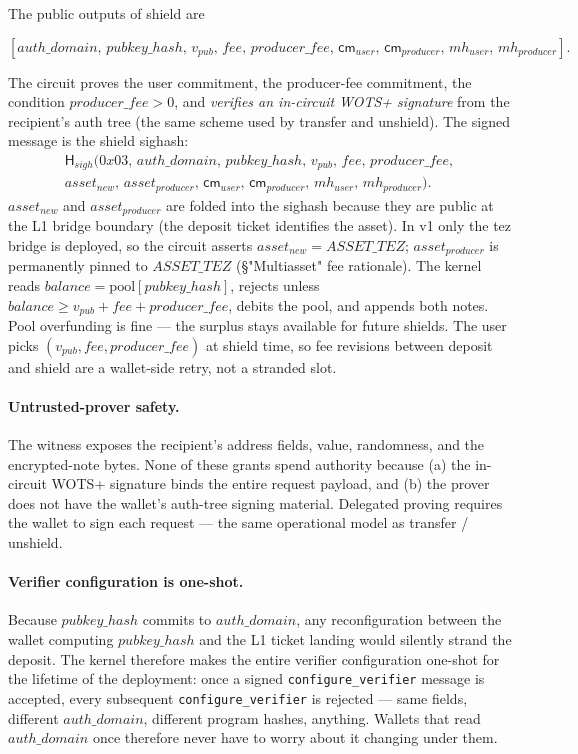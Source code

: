 \documentclass[11pt]{article}
\newcommand{\Hash}{\mathsf{H}}
\newcommand{\cm}{\mathsf{cm}}
\begin{document}
The public outputs of shield are

\[
[auth\_domain,\, pubkey\_hash,\, v_{pub},\, fee,\, producer\_fee,\, \cm_{user},\, \cm_{producer},\,
 mh_{user},\, mh_{producer}].
\]

The circuit proves the user commitment, the producer-fee commitment, the
condition \(producer\_fee > 0\), and \emph{verifies an in-circuit WOTS+
signature} from the recipient's auth tree (the same scheme used by
transfer and unshield). The signed message is the shield sighash:
\begin{multline*}
\Hash_{sigh}(0x03,\, auth\_domain,\, pubkey\_hash,\, v_{pub},\, fee,\, producer\_fee,\\
              asset_{new},\, asset_{producer},\,
              \cm_{user},\, \cm_{producer},\, mh_{user},\, mh_{producer}).
\end{multline*}
\(asset_{new}\) and \(asset_{producer}\) are folded into the sighash
because they are public at the L1 bridge boundary (the deposit ticket
identifies the asset). In v1 only the tez bridge is deployed, so the
circuit asserts \(asset_{new} = ASSET\_TEZ\); \(asset_{producer}\) is
permanently pinned to \(ASSET\_TEZ\) (§"Multiasset" fee rationale).
The kernel reads \(balance = \mathrm{pool}[pubkey\_hash]\), rejects unless
\(balance \ge v_{pub} + fee + producer\_fee\), debits the pool, and
appends both notes. Pool overfunding is fine — the surplus stays
available for future shields. The user picks
\((v_{pub}, fee, producer\_fee)\) at shield time, so fee revisions
between deposit and shield are a wallet-side retry, not a stranded slot.

\paragraph{Untrusted-prover safety.} The witness exposes the recipient's
address fields, value, randomness, and the encrypted-note bytes. None of these
grants spend authority because (a) the in-circuit WOTS+ signature binds the
entire request payload, and (b) the prover does not have the wallet's
auth-tree signing material. Delegated proving requires the wallet to
sign each request — the same operational model as transfer / unshield.

\paragraph{Verifier configuration is one-shot.} Because
\(pubkey\_hash\) commits to \(auth\_domain\), any reconfiguration
between the wallet computing \(pubkey\_hash\) and the L1 ticket landing
would silently strand the deposit. The kernel therefore makes the
entire verifier configuration one-shot for the lifetime of the
deployment: once a signed \texttt{configure\_verifier} message is
accepted, every subsequent \texttt{configure\_verifier} is rejected —
same fields, different \(auth\_domain\), different program hashes,
anything. Wallets that read \(auth\_domain\) once therefore never have
to worry about it changing under them.
\end{document}
